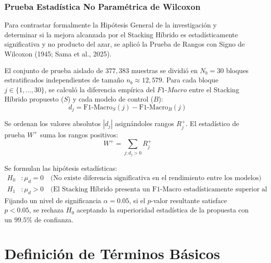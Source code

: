\subsubsection{Prueba Estadística No Paramétrica de Wilcoxon}
Para contrastar formalmente la Hipótesis General de la investigación y determinar si la mejora alcanzada por el Stacking Híbrido es estadísticamente significativa y no producto del azar, se aplicó la Prueba de Rangos con Signo de Wilcoxon (1945; Sama et al., 2025).

El conjunto de prueba aislado de $377,383$ muestras se dividió en $N_b = 30$ bloques estratificados independientes de tamaño $n_b \approx 12,579$. Para cada bloque $j \in \{1, \dots, 30\}$, se calculó la diferencia empírica del $F1\text{-}Macro$ entre el Stacking Híbrido propuesto ($S$) y cada modelo de control ($B$):
\begin{equation}
d_j = \mathrm{F1\text{-}Macro}_S(j) - \mathrm{F1\text{-}Macro}_B(j)
\end{equation}

Se ordenan los valores absolutos $|d_j|$ asignándoles rangos $R_j^+$. El estadístico de prueba $W^+$ suma los rangos positivos:
\begin{equation}
W^+ = \sum_{j: d_j > 0} R_j^+
\end{equation}

Se formulan las hipótesis estadísticas:
\begin{align}
H_0 &: \mu_d = 0 \quad \text{(No existe diferencia significativa en el rendimiento entre los modelos)} \\
H_1 &: \mu_d > 0 \quad \text{(El Stacking Híbrido presenta un F1-Macro estadísticamente superior al modelo de control)}
\end{align}
Fijando un nivel de significancia $\alpha = 0.05$, si el $p$-valor resultante satisface $p < 0.05$, se rechaza $H_0$ aceptando la superioridad estadística de la propuesta con un $99.5\%$ de confianza.

\section{Definición de Términos Básicos}

